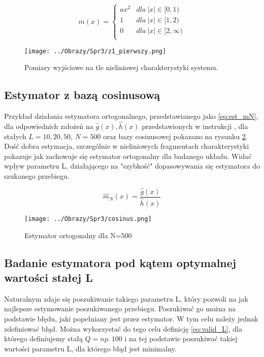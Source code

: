 \documentclass[12pt,a4paper]{article}
\begin{document}
\begin{equation}\label{eq:SISO}
m(x)=\begin{cases} 
ax^{2} & dla\ |x| \in [0,1) \\
1 & dla\ |x| \in [1,2) \\
0 & dla\ |x| \in [2,\infty) \\
\end{cases}
\end{equation}

\begin{figure}[H]
\centering
\texttt{[image: ../Obrazy/Spr3/z1\_pierwszy.png]} 
\caption{Pomiary wyjściowe na tle nieliniowej charakterystyki systemu.}
\label{fig:z1_pierwszy}
\end{figure}

\subsection{Estymator z bazą cosinusową}
Przykład działania estymatora ortogonalnego, przedstawianego jako \ref{eq:est_mN}, dla odpowiednich założeń na $\hat{g}(x),\hat{h}(x)$ przedstawionych w instrukcji \cite{wachelLab7}, dla stałych $L=10,20,50$, $N=500$ oraz bazy cosinusowej pokazano na rysunku \ref{fig:cosinus}.
Dość dobra estymacja, szczególnie w nieliniowych fragmentach charakterystyki pokazuje jak zachowuje się estymator ortogonalny dla badanego układu.
Widać wpływ parametru L, działającego na "szybkość" dopasowywania się estymatora do szukanego przebiegu.

\begin{equation}\label{eq:est_mN}
\hat{m}_{N}(x)=\frac{\hat{g}(x)}{\hat{h}(x)}
\end{equation}

\begin{figure}[H]
\centering
\texttt{[image: ../Obrazy/Spr3/cosinus.png]} 
\caption{Estymator ortogonalny dla N=500}
\label{fig:cosinus}
\end{figure}


\subsection{Badanie estymatora pod kątem optymalnej wartości stałej L}
Naturalnym zdaje się poszukiwanie takiego parametru L, który pozwoli na jak najlepsze estymowanie poszukiwanego przebiegu.
Poszukiwać go można na podstawie błędu, jaki popełniany jest przez estymator.
W tym celu należy jednak zdefiniować błąd.
Można wykorzystać do tego celu definicję \ref{eq:valid_L}, dla którego definiujemy stałą $Q=np.\ 100$ i na tej podstawie poszukiwać takiej wartości parametru L, dla którego błąd jest minimalny.
\end{document}
